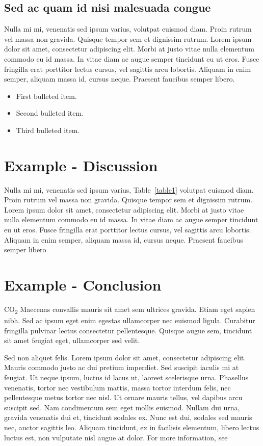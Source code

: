 \documentclass[10pt,letterpaper]{article}
\begin{document}
\subsection*{Sed ac quam id nisi malesuada congue}

Nulla mi mi, venenatis sed ipsum varius, volutpat euismod diam. Proin rutrum vel massa non gravida. Quisque tempor sem et dignissim rutrum. Lorem ipsum dolor sit amet, consectetur adipiscing elit. Morbi at justo vitae nulla elementum commodo eu id massa. In vitae diam ac augue semper tincidunt eu ut eros. Fusce fringilla erat porttitor lectus cursus, vel sagittis arcu lobortis. Aliquam in enim semper, aliquam massa id, cursus neque. Praesent faucibus semper libero.

\begin{itemize}
	\item First bulleted item.
	\item Second bulleted item.
	\item Third bulleted item.
\end{itemize}

\section*{Example - Discussion}
Nulla mi mi, venenatis sed ipsum varius, Table~\ref{table1} volutpat euismod diam. Proin rutrum vel massa non gravida. Quisque tempor sem et dignissim rutrum. Lorem ipsum dolor sit amet, consectetur adipiscing elit. Morbi at justo vitae nulla elementum commodo eu id massa. In vitae diam ac augue semper tincidunt eu ut eros. Fusce fringilla erat porttitor lectus cursus, vel sagittis arcu lobortis. Aliquam in enim semper, aliquam massa id, cursus neque. Praesent faucibus semper libero  %

\section*{Example - Conclusion}

CO\textsubscript{2} Maecenas convallis mauris sit amet sem ultrices gravida. Etiam eget sapien nibh. Sed ac ipsum eget enim egestas ullamcorper nec euismod ligula. Curabitur fringilla pulvinar lectus consectetur pellentesque. Quisque augue sem, tincidunt sit amet feugiat eget, ullamcorper sed velit. 

Sed non aliquet felis. Lorem ipsum dolor sit amet, consectetur adipiscing elit. Mauris commodo justo ac dui pretium imperdiet. Sed suscipit iaculis mi at feugiat. Ut neque ipsum, luctus id lacus ut, laoreet scelerisque urna. Phasellus venenatis, tortor nec vestibulum mattis, massa tortor interdum felis, nec pellentesque metus tortor nec nisl. Ut ornare mauris tellus, vel dapibus arcu suscipit sed. Nam condimentum sem eget mollis euismod. Nullam dui urna, gravida venenatis dui et, tincidunt sodales ex. Nunc est dui, sodales sed mauris nec, auctor sagittis leo. Aliquam tincidunt, ex in facilisis elementum, libero lectus luctus est, non vulputate nisl augue at dolor. For more information, see %
\end{document}
